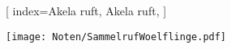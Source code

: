 [
    index={Akela ruft, Akela ruft},
]

\beginverse
\endverse
\texttt{[image: Noten/SammelrufWoelflinge.pdf]}

\endsong
